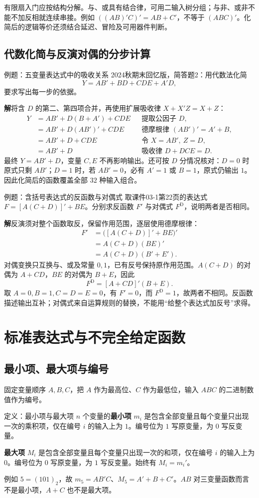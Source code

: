 \documentclass[UTF8,fontset=none,zihao=-4,a4paper]{ctexart}
\newcommand{\chapterpage}[1]{\clearpage\section{#1}}
\newcommand{\term}[1]{\textbf{#1}}
\newcommand{\sol}{\par\noindent\textbf{解}\quad}
\begin{document}
有限扇入门应按结构分解。与、或具有结合律，可用二输入树分组；与非、或非不能不加反相就连续串接。例如 $((AB)'C)'=AB+C'$，不等于 $(ABC)'$。化简后的逻辑等价还须结合延迟、冒险及可用器件判断。

\subsection{代数化简与反演对偶的分步计算}
\begin{infobox}{例题：五变量表达式中的吸收关系}
2024秋期末回忆版，简答题2：用代数法化简
\[
Y=AB'+BD+CDE+A'D,
\]
要求写出每一步的依据。
\end{infobox}
\sol 将含 $D$ 的第二、第四项合并，再使用扩展吸收律 $X+X'Z=X+Z$：
\begin{align*}
Y&=AB'+D(B+A')+CDE &&\text{提取公因子 }D,\\
 &=AB'+D(AB')'+CDE &&\text{德摩根律 }(AB')'=A'+B,\\
 &=AB'+D+CDE &&\text{令 }X=AB',\ Z=D,\\
 &=AB'+D &&\text{吸收律 }D+DCE=D.
\end{align*}
最终 $Y=AB'+D$，变量 $C,E$ 不再影响输出。还可按 $D$ 分情况核对：$D=0$ 时原式只剩 $AB'$；$D=1$ 时，若 $AB'=0$，必有 $A'=1$ 或 $B=1$，原式仍输出 $1$。因此化简后的函数覆盖全部 $32$ 种输入组合。

\begin{infobox}{例题：含括号表达式的反函数与对偶式}
取课件03-1第22页的表达式 $F=[A(C+D)]'+BE$。分别求反函数 $F'$ 与对偶式 $F^{\mathrm D}$，说明两者是否相同。
\end{infobox}
\sol 反演须对整个函数取反，保留作用范围，逐层使用德摩根律：
\begin{align*}
F'&=\bigl([A(C+D)]'+BE\bigr)'\\
  &=A(C+D)(BE)'\\
  &=A(C+D)(B'+E').
\end{align*}
对偶变换只互换与、或及常量 $0,1$，已有反号保持原作用范围。$A(C+D)$ 的对偶为 $A+CD$，$BE$ 的对偶为 $B+E$，因此
\[
F^{\mathrm D}=[A+CD]'(B+E).
\]
取 $A=0,B=1,C=D=E=0$，有 $F'=0$，而 $F^{\mathrm D}=1$，故两者不相同。反函数描述输出互补；对偶式来自运算规则的替换，不能用“给整个表达式加反号”求得。


\chapterpage{标准表达式与不完全给定函数}
\subsection{最小项、最大项与编号}
固定变量顺序 $A,B,C$，把 $A$ 作为最高位、$C$ 作为最低位，输入 $ABC$ 的二进制数值作为编号。
\begin{infobox}{定义：最小项与最大项}
$n$ 个变量的\term{最小项} $m_i$ 是包含全部变量且每个变量只出现一次的乘积项，仅在编号 $i$ 的输入上为 $1$。编号位为 $1$ 写原变量，为 $0$ 写反变量。

\term{最大项} $M_i$ 是包含全部变量且每个变量只出现一次的和项，仅在编号 $i$ 的输入上为 $0$。编号位为 $0$ 写原变量，为 $1$ 写反变量。始终有 $M_i=m_i'$。
\end{infobox}
例如 $5=(101)_2$，故 $m_5=AB'C$、$M_5=A'+B+C'$。$AB$ 对三变量函数而言不是最小项，$A+C$ 也不是最大项。
\end{document}
